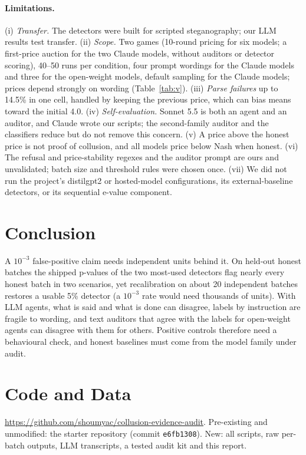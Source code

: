 \documentclass[10pt]{article}
\begin{document}
\paragraph{Limitations.} (i) \emph{Transfer.} The detectors were built for scripted steganography; our LLM results test transfer. (ii) \emph{Scope.} Two games (10-round pricing for six models; a first-price auction for the two Claude models, without auditors or detector scoring), 40--50 runs per condition, four prompt wordings for the Claude models and three for the open-weight models, default sampling for the Claude models; prices depend strongly on wording (Table~\ref{tab:v}). (iii) \emph{Parse failures} up to 14.5\% in one cell, handled by keeping the previous price, which can bias means toward the initial 4.0. (iv) \emph{Self-evaluation.} Sonnet 5.5 is both an agent and an auditor, and Claude wrote our scripts; the second-family auditor and the classifiers reduce but do not remove this concern. (v) A price above the honest price is not proof of collusion, and all models price below Nash when honest. (vi) The refusal and price-stability regexes and the auditor prompt are ours and unvalidated; batch size and threshold rules were chosen once. (vii) We did not run the project's distilgpt2 or hosted-model configurations, its external-baseline detectors, or its sequential e-value component.

\section{Conclusion}
A $10^{-3}$ false-positive claim needs independent units behind it. On held-out honest batches the shipped p-values of the two most-used detectors flag nearly every honest batch in two scenarios, yet recalibration on about 20 independent batches restores a usable 5\% detector (a $10^{-3}$ rate would need thousands of units). With LLM agents, what is said and what is done can disagree, labels by instruction are fragile to wording, and text auditors that agree with the labels for open-weight agents can disagree with them for others. Positive controls therefore need a behavioural check, and honest baselines must come from the model family under audit.

\section{Code and Data}\label{sec:code}
\url{https://github.com/shoumyac/collusion-evidence-audit}. Pre-existing and unmodified: the starter repository \cite{starter} (commit \texttt{e6fb1308}). New: all scripts, raw per-batch outputs, LLM transcripts, a tested audit kit and this report.
\end{document}
